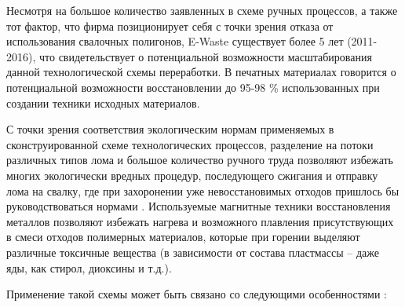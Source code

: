Несмотря на большое количество заявленных в схеме ручных процессов, а также тот фактор, что фирма позиционирует себя с точки зрения отказа от использования свалочных полигонов, E-Waste существует более 5 лет (2011-2016), что свидетельствует о потенциальной возможности масштабирования данной технологической схемы переработки. В печатных материалах говорится о потенциальной возможности восстановлении до 95-98 \% использованных при создании техники исходных материалов.

С точки зрения соответствия экологическим нормам применяемых в сконструированной схеме технологических процессов, разделение на потоки различных типов лома и большое количество ручного труда позволяют избежать многих экологически вредных процедур, последующего сжигания и отправку лома на свалку, где при захоронении уже невосстановимых отходов пришлось бы руководствоваться нормами \cite{SNIP}. Используемые магнитные техники восстановления металлов позволяют избежать нагрева и возможного плавления присутствующих в смеси отходов полимерных материалов, которые при горении выделяют различные токсичные вещества (в зависимости от состава пластмассы – даже яды, как стирол, диоксины и т.д.).

Применение такой схемы может быть связано со следующими особенностями \cite {ECOLOGY}:

